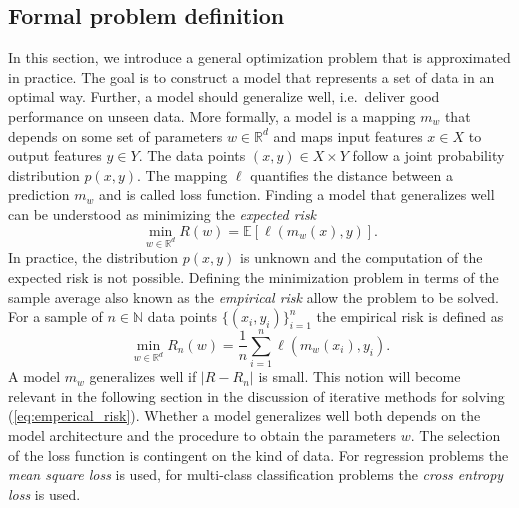 \documentclass[12pt]{article}
\theoremstyle{definition}
\numberwithin{equation}{section}
\newcommand{\ev}[1]{\mathbb{E}\left[{#1}\right]}
\begin{document}
\subsection{Formal problem definition}
In this section, we introduce a general optimization problem that is approximated in practice. The goal is to construct a model that represents a set of data in an optimal way. Further, a model should generalize well, i.e.\ deliver good performance on unseen data. More formally, a model is a mapping $m_w$ that depends on some set of parameters $w \in \mathbb{R}^d$ and maps input features $x \in X$ to output features $y \in Y$. The data points $(x,y) \in X \times Y$ follow a joint probability distribution $p(x,y)$. The mapping $\ell$ quantifies the distance between a prediction $m_{w}$ and is called loss function. Finding a model that generalizes well can be understood as minimizing the \emph{expected risk}
\begin{equation}
  \min_{w \in \mathbb{R}^d} R(w) = \ev{\ell(m_{w}(x),y)}.
\end{equation}
In practice, the distribution $p(x,y)$ is unknown and the computation of the expected risk is not possible. Defining the minimization problem in terms of the sample average also known as the \emph{empirical risk} allow the problem to be solved. For a sample of $n \in \mathbb{N}$ data points $\{(x_i, y_i)\}_{i=1}^n$ the empirical risk is defined as 
\begin{equation}
  \label{eq:emperical_risk}
  \min_{w \in \mathbb{R}^d}  R_n(w) = \frac{1}{n}\sum_{i=1}^n\ell(m_{w}(x_i),y_i).
\end{equation}
A model $m_{w}$ generalizes well if $|R - R_n|$ is small. This notion will become relevant in the following section in the discussion of iterative methods for solving (\ref{eq:emperical_risk}). Whether a model generalizes well both depends on the model architecture and the procedure to obtain the parameters $w$. 
The selection of the loss function is contingent on the kind of data. For regression problems the \emph{mean square loss} is used, for multi-class classification problems the \emph{cross entropy loss} is used.
\end{document}
